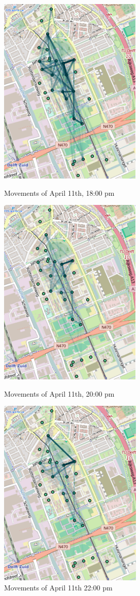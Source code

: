 \begin{figure}[H]
\includegraphics[scale=0.6,left]{frame075}
\captionsetup{justification=centering}
\caption{Movements of April 11th, 18:00 pm}
\endminipage\hfill
{}
\includegraphics[scale=0.6,center]{frame087}
\captionsetup{justification=centering}
\caption{Movements of April 11th, 20:00 pm}
\endminipage\hfill
{}
\includegraphics[scale=0.6,right]{frame099}
\captionsetup{justification=centering}
\caption{Movements of April 11th 22:00 pm}
\endminipage\hfill
\end{figure}

